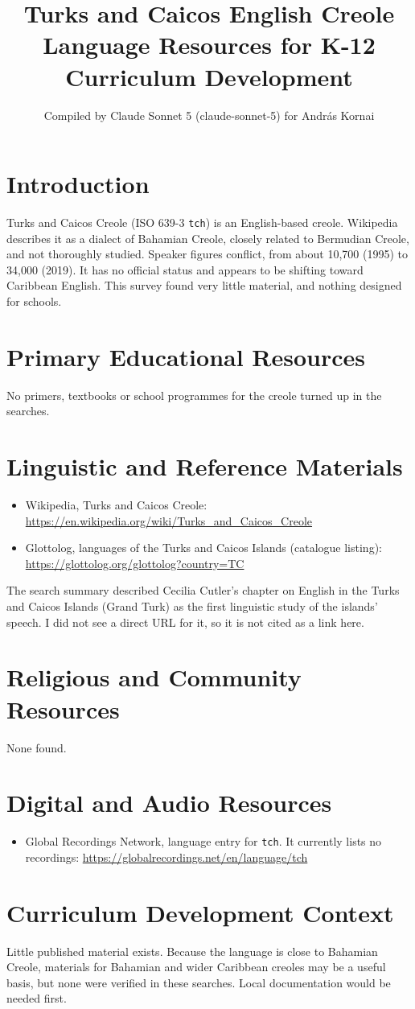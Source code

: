 \documentclass[12pt]{article}
\title{Turks and Caicos English Creole Language Resources for K-12 Curriculum Development}
\author{Compiled by Claude Sonnet 5 (claude-sonnet-5) for Andr\'as Kornai}
\date{}
\begin{document}
\maketitle

\section{Introduction}
Turks and Caicos Creole (ISO 639-3 \texttt{tch}) is an English-based creole. Wikipedia describes it as a dialect of Bahamian Creole, closely related to Bermudian Creole, and not thoroughly studied. Speaker figures conflict, from about 10,700 (1995) to 34,000 (2019). It has no official status and appears to be shifting toward Caribbean English. This survey found very little material, and nothing designed for schools.

\section{Primary Educational Resources}
No primers, textbooks or school programmes for the creole turned up in the searches.

\section{Linguistic and Reference Materials}
\begin{itemize}
\item Wikipedia, Turks and Caicos Creole: \url{https://en.wikipedia.org/wiki/Turks_and_Caicos_Creole}
\item Glottolog, languages of the Turks and Caicos Islands (catalogue listing): \url{https://glottolog.org/glottolog?country=TC}
\end{itemize}
The search summary described Cecilia Cutler's chapter on English in the Turks and Caicos Islands (Grand Turk) as the first linguistic study of the islands' speech. I did not see a direct URL for it, so it is not cited as a link here.

\section{Religious and Community Resources}
None found.

\section{Digital and Audio Resources}
\begin{itemize}
\item Global Recordings Network, language entry for \texttt{tch}. It currently lists no recordings: \url{https://globalrecordings.net/en/language/tch}
\end{itemize}

\section{Curriculum Development Context}
Little published material exists. Because the language is close to Bahamian Creole, materials for Bahamian and wider Caribbean creoles may be a useful basis, but none were verified in these searches. Local documentation would be needed first.
\end{document}
